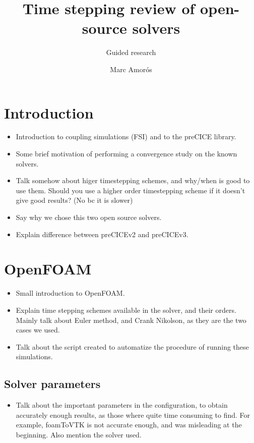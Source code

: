 \documentclass[
  english,        %
  font=times,     %
  onecolumn,      %
]{tumarticle}
\title{Time stepping review of open-source solvers}
\subtitle{Guided research}
\author[email=marc.amoros@tum.de]{Marc Amorós}
\date{}
\begin{document}
\maketitle


\section{Introduction}
\begin{itemize}
    \item Introduction to coupling simulations (FSI) and to the preCICE library. 
    \item Some brief motivation of performing a convergence study on the known solvers.
    \item Talk somehow about higer timestepping schemes, and why/when is good to use them. Should you use a higher order timestepping scheme if it doesn't give good results? (No bc it is slower) 
    \item Say why we chose this two open source solvers.
    \item Explain difference between preCICEv2 and preCICEv3.
\end{itemize}


\section{OpenFOAM}
\begin{itemize}
    \item Small introduction to OpenFOAM.
    \item Explain time stepping schemes available in the solver, and their orders. Mainly talk about Euler method, and Crank Nikolson, as they are the two cases we used.
    \item Talk about the script created to automatize the procedure of running these simulations. 
\end{itemize}

\subsection{Solver parameters}
\begin{itemize}
    \item Talk about the important parameters in the configuration, to obtain accurately enough results, as those where quite time consuming to find. For example, foamToVTK is not accurate enough, and was misleading at the beginning. Also mention the solver used.
\end{itemize}
\end{document}
